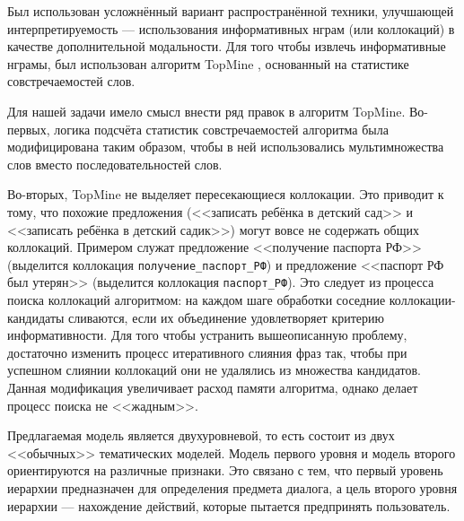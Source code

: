 Был использован усложнённый вариант распространённой техники, улучшающей интерпретируемость --- использования информативных нграм (или коллокаций) в качестве дополнительной модальности. Для того чтобы извлечь информативные нграмы, был использован алгоритм TopMine \cite{topmine}, основанный на статистике совстречаемостей слов.

Для нашей задачи имело смысл внести ряд правок в алгоритм TopMine. Во-первых, логика подсчёта статистик совстречаемостей алгоритма была модифицирована таким образом, чтобы в ней использовались мультимножества слов вместо последовательностей слов. 

Во-вторых, TopMine не выделяет пересекающиеся коллокации. Это приводит к тому, что похожие предложения (<<записать ребёнка в детский сад>> и <<записать ребёнка в детский садик>>) могут вовсе не содержать общих коллокаций. Примером служат предложение <<получение паспорта РФ>> (выделится коллокация \texttt{получение\_паспорт\_РФ}) и предложение <<паспорт РФ был утерян>> (выделится коллокация \texttt{паспорт\_РФ}). Это следует из процесса поиска коллокаций алгоритмом: на каждом шаге обработки соседние коллокации-кандидаты сливаются, если их объединение удовлетворяет критерию информативности. Для того чтобы устранить вышеописанную проблему, достаточно изменить процесс итеративного слияния фраз так, чтобы при успешном слиянии коллокаций они не удалялись из множества кандидатов. Данная модификация увеличивает расход памяти алгоритма, однако делает процесс поиска не <<жадным>>.


Предлагаемая модель является двухуровневой, то есть состоит из двух <<обычных>> тематических моделей. Модель первого уровня и модель второго ориентируются на различные признаки. Это связано с тем, что первый уровень иерархии предназначен для определения предмета диалога, а цель второго уровня иерархии --- нахождение действий, которые пытается предпринять пользователь. %

